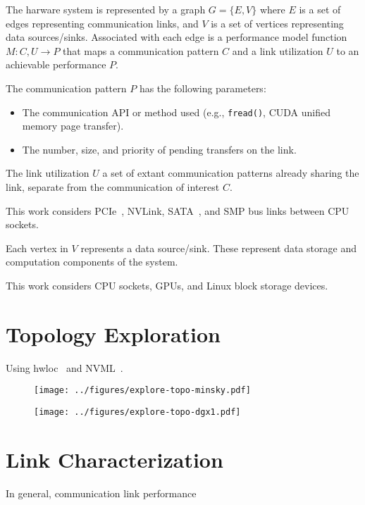 The harware system is represented by a graph $G = \{E,V\}$ where $E$ is a set of edges representing communication links, and $V$ is a set of vertices representing data sources/sinks.
Associated with each edge is a performance model function $M: C,U \rightarrow P$ that maps a communication pattern $C$ and a link utilization $U$ to an achievable performance $P$.

The communication pattern $P$ has the following parameters:
\begin{itemize}
    \item The communication API or method used (e.g., \texttt{fread()}, CUDA unified memory page transfer).
    \item The number, size, and priority of pending transfers on the link.
\end{itemize}

The link utilization $U$ a set of extant communication patterns already sharing the link, separate from the communication of interest $C$.

This work considers PCIe~, NVLink\cite{nvidia2017nvlink}, SATA~, and SMP bus links between CPU sockets.

Each vertex in $V$ represents a data source/sink. These represent data storage and computation components of the system.

This work considers CPU sockets, GPUs, and Linux block storage devices.

\section{Topology Exploration}
\label{sec:topology-exploration}

Using hwloc~\cite{broquedis2010hwloc} and NVML~\cite{nvidia2017nvml}.

\begin{figure}[h]
    \centering
    \caption[]{}
    \centering
      \texttt{[image: ../figures/explore-topo-minsky.pdf]}
    \label{fig:actual-perf}
\end{figure}

\begin{figure}[h]
    \centering
    \caption[]{}
    \centering
      \texttt{[image: ../figures/explore-topo-dgx1.pdf]}
    \label{fig:actual-perf}
\end{figure}


\section{Link Characterization}
\label{sec:link-char}

In general, communication link performance 


